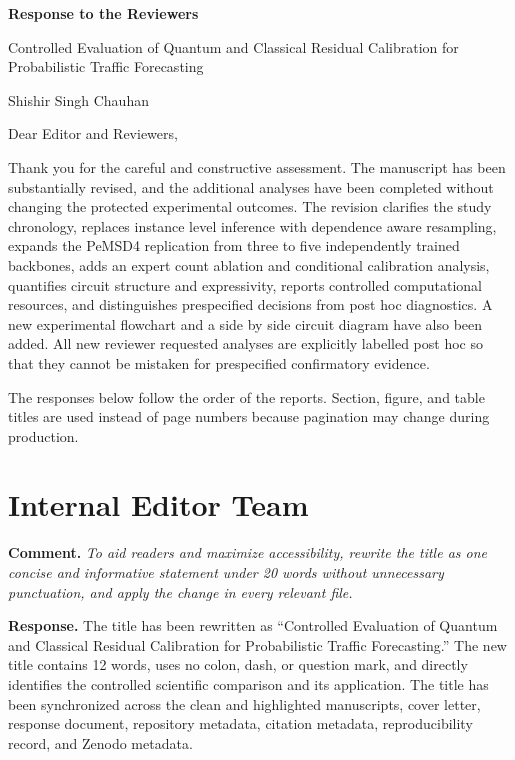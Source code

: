 \documentclass[11pt]{article}
\newcommand{\comment}[1]{\textbf{Comment.} \emph{#1}}
\newcommand{\response}[1]{\textbf{Response.} #1}
\begin{document}
\begin{center}
{\Large\bfseries Response to the Reviewers}\par
\vspace{0.5em}
{\large Controlled Evaluation of Quantum and Classical Residual Calibration for Probabilistic Traffic Forecasting}\par
\vspace{0.5em}
Shishir Singh Chauhan
\end{center}

Dear Editor and Reviewers,

Thank you for the careful and constructive assessment. The manuscript has been substantially revised, and the additional analyses have been completed without changing the protected experimental outcomes. The revision clarifies the study chronology, replaces instance level inference with dependence aware resampling, expands the PeMSD4 replication from three to five independently trained backbones, adds an expert count ablation and conditional calibration analysis, quantifies circuit structure and expressivity, reports controlled computational resources, and distinguishes prespecified decisions from post hoc diagnostics. A new experimental flowchart and a side by side circuit diagram have also been added. All new reviewer requested analyses are explicitly labelled post hoc so that they cannot be mistaken for prespecified confirmatory evidence.

The responses below follow the order of the reports. Section, figure, and table titles are used instead of page numbers because pagination may change during production.

\section*{Internal Editor Team}

\comment{To aid readers and maximize accessibility, rewrite the title as one concise and informative statement under 20 words without unnecessary punctuation, and apply the change in every relevant file.}

\response{The title has been rewritten as ``Controlled Evaluation of Quantum and Classical Residual Calibration for Probabilistic Traffic Forecasting.'' The new title contains 12 words, uses no colon, dash, or question mark, and directly identifies the controlled scientific comparison and its application. The title has been synchronized across the clean and highlighted manuscripts, cover letter, response document, repository metadata, citation metadata, reproducibility record, and Zenodo metadata.}
\end{document}
